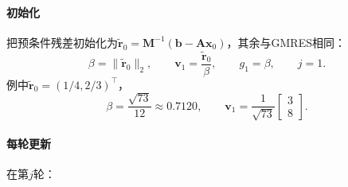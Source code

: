 \paragraph{初始化}
把预条件残差初始化为$\tilde{\bm r}_0=\bm M^{-1}(\bm b-\bm A\bm x_0)$，其余与GMRES相同：
\[
 \beta=\lVert\tilde{\bm r}_0\rVert_2,\qquad \bm v_1=\frac{\tilde{\bm r}_0}{\beta},\qquad g_1=\beta,\qquad j=1 .
\]
例中$\tilde{\bm r}_0=(1/4,2/3)^\top$，
\[
 \beta=\frac{\sqrt{73}}{12}\approx0.7120,\qquad \bm v_1=\frac1{\sqrt{73}}\begin{bmatrix}3\\8\end{bmatrix}.
\]

\paragraph{每轮更新}
在第$j$轮：
